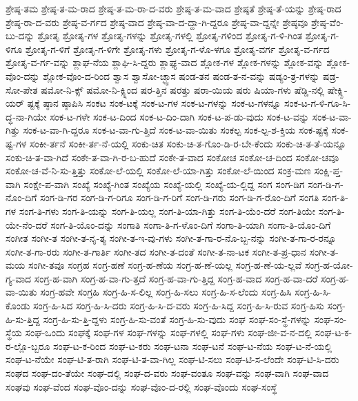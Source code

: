 {ಶ್ರೇಷ್ಠ-ತಮ
ಶ್ರೇಷ್ಠ-ತ-ಮ-ರಾದ
ಶ್ರೇಷ್ಠ-ತ-ಮ-ರಾ-ದ-ವರು
ಶ್ರೇಷ್ಠ-ತ-ಮ-ವಾದ
ಶ್ರೇಷ್ಠತೆ
ಶ್ರೇಷ್ಠ-ತೆ-ಯನ್ನು
ಶ್ರೇಷ್ಠ-ರಾದ
ಶ್ರೇಷ್ಠ-ರಾ-ದ-ವರು
ಶ್ರೇಷ್ಠ-ವ-ರ್ಗದ
ಶ್ರೇಷ್ಠ-ವಾದ
ಶ್ರೇಷ್ಠ-ವಾ-ದ-ದ್ದಾ-ಗಿ-ದ್ದರೂ
ಶ್ರೇಷ್ಠ-ವಾ-ದ್ದನ್ನೇ
ಶ್ರೇಷ್ಠವೂ
ಶ್ರೇಷ್ಠ-ವೆಂ-ಬು-ದನ್ನು
ಶ್ರೋತೃ
ಶ್ರೋತೃ-ಗಳ
ಶ್ರೋತೃ-ಗಳನ್ನು
ಶ್ರೋತೃ-ಗಳಲ್ಲಿ
ಶ್ರೋತೃ-ಗಳಿಂದ
ಶ್ರೋತೃ-ಗ-ಳಿ-ಗಿಂತ
ಶ್ರೋತೃ-ಗ-ಳಿಗೂ
ಶ್ರೋತೃ-ಗ-ಳಿಗೆ
ಶ್ರೋತೃ-ಗ-ಳಿಗೇ
ಶ್ರೋತೃ-ಗಳು
ಶ್ರೋತೃ-ಗ-ಳೊ-ಳಗೂ
ಶ್ರೋತೃ-ವರ್ಗ
ಶ್ರೋತೃ-ವ-ರ್ಗದ
ಶ್ರೋತೃ-ವ-ರ್ಗ-ವನ್ನು
ಶ್ಲಾಘ-ನೆಯ
ಶ್ಲಾಘಿ-ಸಿ-ದ್ದರು
ಶ್ಲಾಘ್ಯ-ವಾದ
ಶ್ಲೋಕ-ಗಳ
ಶ್ಲೋಕ-ಗಳನ್ನು
ಶ್ಲೋಕ-ವನ್ನು
ಶ್ಲೋಕ-ವೊಂ-ದನ್ನು
ಶ್ಲೋಕ-ವೊಂ-ದ-ರಿಂದ
ಶ್ವಾಸ
ಶ್ವಾಸೋ-ಚ್ಛ್ವಾಸ
ಷಂಡ-ತನ
ಷಂಡ-ತ-ನ-ವನ್ನು
ಷಡ್ಯಂ-ತ್ರ-ಗಳನ್ನು
ಷಡ್ರ-ಸೋ-ಪೇತ
ಷಮೋ-ನಿ-ಕ್ಸ್
ಷಮೋ-ನಿ-ಕ್ಸ್ನಿಂದ
ಷರ-ತ್ತಿನ
ಷರತ್ತು
ಷರಾ-ಯಿಯ
ಷರು
ಷಿಯಾ-ಗಳು
ಷೆಡ್ಡಿ-ನಲ್ಲಿ
ಷೇಕ್ಸ್ಪಿ-ಯರ್
ಷ್ಟಕ್ಕೆ
ಷ್ಠಾನ
ಷ್ಠಾಪಿಸಿ
ಸಂಕಟ
ಸಂಕ-ಟಕ್ಕೆ
ಸಂಕ-ಟ-ಗಳ
ಸಂಕ-ಟ-ಗಳನ್ನು
ಸಂಕ-ಟ-ಗಳನ್ನೂ
ಸಂಕ-ಟ-ಗ-ಳಿ-ಗೂ-ಸಿ-ದ್ಧ-ನಾ-ಗಿಯೇ
ಸಂಕ-ಟ-ಗಳೇ
ಸಂಕ-ಟ-ದಿಂದ
ಸಂಕ-ಟ-ದಿಂ-ದಾಗಿ
ಸಂಕ-ಟ-ಪ-ಡು-ವುದು
ಸಂಕ-ಟ-ವನ್ನು
ಸಂಕ-ಟ-ವಾ-ಗಿತ್ತು
ಸಂಕ-ಟ-ವಾ-ಗಿ-ದ್ದರೂ
ಸಂಕ-ಟ-ವಾ-ಗು-ತ್ತಿದೆ
ಸಂಕ-ಟ-ವಾ-ಯಿತು
ಸಂಕಲ್ಪ
ಸಂಕ-ಲ್ಪ-ಶ-ಕ್ತಿಯ
ಸಂಕ-ಷ್ಟಕ್ಕೆ
ಸಂಕ-ಷ್ಟ-ಗಳ
ಸಂಕೀ-ರ್ತನೆ
ಸಂಕೀ-ರ್ತ-ನೆ-ಯಲ್ಲಿ
ಸಂಕು-ಚಿತ
ಸಂಕು-ಚಿ-ತ-ಗೊಂ-ಡಿ-ರ-ಬೇ-ಕೆಂದು
ಸಂಕು-ಚಿ-ತ-ತೆ-ಯನ್ನೂ
ಸಂಕು-ಚಿ-ತ-ವಾ-ಗಿದೆ
ಸಂಕೇ-ತ-ವಾ-ಗಿ-ರ-ಬ-ಹುದೆ
ಸಂಕೇ-ತ-ವಾದ
ಸಂಕೋಚ
ಸಂಕೋ-ಚ-ದಿಂದ
ಸಂಕೋ-ಚವೂ
ಸಂಕೋ-ಚ-ವೆ-ನಿ-ಸು-ತ್ತಿತ್ತು
ಸಂಕೋ-ಲೆ-ಯಲ್ಲಿ
ಸಂಕೋ-ಲೆ-ಯಾ-ಗಿತ್ತು
ಸಂಕೋ-ಲೆ-ಯಿಂದ
ಸಂಕ್ರ-ಮಣ
ಸಂಕ್ಷಿ-ಪ್ತ-ವಾಗಿ
ಸಂಕ್ಷೇ-ಪ-ವಾಗಿ
ಸಂಖ್ಯೆ
ಸಂಖ್ಯೆ-ಗಿಂತ
ಸಂಖ್ಯೆಯ
ಸಂಖ್ಯೆ-ಯಲ್ಲಿ
ಸಂಖ್ಯೆ-ಯ-ಲ್ಲಿದ್ದ
ಸಂಗ
ಸಂಗ-ಡಿಗ
ಸಂಗ-ಡಿ-ಗ-ನೊಂ-ದಿಗೆ
ಸಂಗ-ಡಿ-ಗರ
ಸಂಗ-ಡಿ-ಗ-ರಿಗೂ
ಸಂಗ-ಡಿ-ಗ-ರಿಗೆ
ಸಂಗ-ಡಿ-ಗರು
ಸಂಗ-ಡಿ-ಗ-ರೊಂ-ದಿಗೆ
ಸಂಗತಿ
ಸಂಗ-ತಿ-ಗಳ
ಸಂಗ-ತಿ-ಗಳು
ಸಂಗ-ತಿ-ಯನ್ನು
ಸಂಗ-ತಿ-ಯಲ್ಲ
ಸಂಗ-ತಿ-ಯಾ-ಗಿತ್ತು
ಸಂಗ-ತಿ-ಯೆಂ-ದರೆ
ಸಂಗ-ತಿಯೇ
ಸಂಗ-ತಿ-ಯೇ-ನೆಂ-ದರೆ
ಸಂಗ-ತಿ-ಯೊಂ-ದನ್ನು
ಸಂಗಾತಿ
ಸಂಗಾ-ತಿ-ಗ-ಳೊಂ-ದಿಗೆ
ಸಂಗಾ-ತಿ-ಯಾಗಿ
ಸಂಗಾ-ತಿ-ಯೊಂ-ದಿಗೆ
ಸಂಗೀತ
ಸಂಗೀ-ತ
ಸಂಗೀ-ತ-ನೃ-ತ್ಯ
ಸಂಗೀ-ತ-ಇ-ವು-ಗಳು
ಸಂಗೀ-ತ-ಗಾ-ರ-ನೊ-ಬ್ಬ-ನನ್ನು
ಸಂಗೀ-ತ-ಗಾ-ರ-ರನ್ನೂ
ಸಂಗೀ-ತ-ಗಾ-ರರು
ಸಂಗೀ-ತ-ಗಾರ್ತಿ
ಸಂಗೀ-ತದ
ಸಂಗೀ-ತ-ದಂತೆ
ಸಂಗೀ-ತ-ನಾ-ಟಕ
ಸಂಗೀ-ತ-ಪ್ರ-ಧಾನ
ಸಂಗೀ-ತ-ಮಯ
ಸಂಗೀ-ತವೂ
ಸಂಗ್ರಹ
ಸಂಗ್ರ-ಹಣೆ
ಸಂಗ್ರ-ಹ-ಣೆಯ
ಸಂಗ್ರ-ಹ-ಣೆ-ಯಲ್ಲ
ಸಂಗ್ರ-ಹ-ಣೆ-ಯ-ಲ್ಲವೆ
ಸಂಗ್ರ-ಹ-ಯೋ-ಗ್ಯ-ವಾದ
ಸಂಗ್ರ-ಹ-ವಾಗಿ
ಸಂಗ್ರ-ಹ-ವಾ-ಗು-ತ್ತದೆ
ಸಂಗ್ರ-ಹ-ವಾ-ಗು-ತ್ತಿದ್ದ
ಸಂಗ್ರ-ಹ-ವಾದ
ಸಂಗ್ರ-ಹ-ವಾ-ದರೆ
ಸಂಗ್ರ-ಹ-ವಾ-ಯಿತು
ಸಂಗ್ರ-ಹವೇ
ಸಂಗ್ರಹಿ
ಸಂಗ್ರ-ಹಿ-ಸ-ಲಿಲ್ಲ
ಸಂಗ್ರ-ಹಿ-ಸಲು
ಸಂಗ್ರ-ಹಿ-ಸ-ಲೆಂದು
ಸಂಗ್ರ-ಹಿಸಿ
ಸಂಗ್ರ-ಹಿ-ಸಿ-ಕೊಂಡು
ಸಂಗ್ರ-ಹಿ-ಸಿದ
ಸಂಗ್ರ-ಹಿ-ಸಿ-ದರು
ಸಂಗ್ರ-ಹಿ-ಸಿ-ದ-ವರು
ಸಂಗ್ರ-ಹಿ-ಸಿದ್ದ
ಸಂಗ್ರ-ಹಿ-ಸಿ-ರುವ
ಸಂಗ್ರ-ಹಿಸು
ಸಂಗ್ರ-ಹಿ-ಸು-ತ್ತಿದ್ದ
ಸಂಗ್ರ-ಹಿ-ಸು-ತ್ತಿ-ದ್ದಳು
ಸಂಗ್ರ-ಹಿ-ಸು-ವಂತೆ
ಸಂಗ್ರ-ಹಿ-ಸು-ವುದು
ಸಂಘ
ಸಂಘ-ಸಂ-ಸ್ಥೆ-ಗಳನ್ನು
ಸಂಘ-ಸಂ-ಸ್ಥೆಯ
ಸಂಘ-ಒಂದು
ಸಂಘಕ್ಕೆ
ಸಂಘ-ಗಳ
ಸಂಘ-ಗಳನ್ನು
ಸಂಘ-ಗಳಲ್ಲಿ
ಸಂಘ-ಗಳು
ಸಂಘ-ಜೀ-ವ-ನ-ದಲ್ಲಿ
ಸಂಘ-ಟ-ಕ-ರ-ಲ್ಲೊ-ಬ್ಬರೂ
ಸಂಘ-ಟ-ಕ-ರಿಂದ
ಸಂಘ-ಟ-ಕರು
ಸಂಘ-ಟನಾ
ಸಂಘ-ಟನೆ
ಸಂಘ-ಟ-ನೆಯ
ಸಂಘ-ಟ-ನೆ-ಯಲ್ಲಿ
ಸಂಘ-ಟ-ನೆಯೇ
ಸಂಘ-ಟಿ-ತ-ರಾಗಿ
ಸಂಘ-ಟಿ-ತ-ವಾ-ಗಿಲ್ಲ
ಸಂಘ-ಟಿ-ಸಲು
ಸಂಘ-ಟಿ-ಸ-ಲೆಂದೇ
ಸಂಘ-ಟಿ-ಸಿ-ದರು
ಸಂಘದ
ಸಂಘ-ದಂ-ತೆಯೇ
ಸಂಘ-ದಲ್ಲಿ
ಸಂಘ-ದ-ವರು
ಸಂಘ-ವಂತೂ
ಸಂಘ-ವನ್ನು
ಸಂಘ-ವಾಗಿ
ಸಂಘ-ವಾದ
ಸಂಘವು
ಸಂಘ-ವೆಂದ
ಸಂಘ-ವೊಂ-ದನ್ನು
ಸಂಘ-ವೊಂ-ದ-ರಲ್ಲಿ
ಸಂಘ-ವೊಂದು
ಸಂಘ-ಸಂಸ್ಥೆ
}
